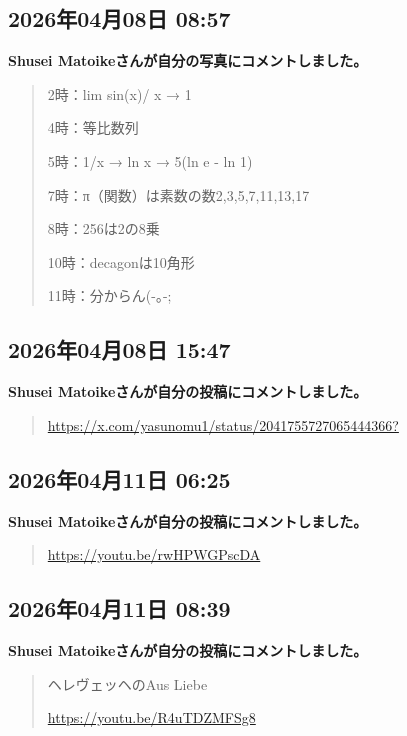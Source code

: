 \subsection*{2026年04月08日 08:57}

\textbf{Shusei Matoikeさんが自分の写真にコメントしました。}

\begin{quote}
2時：lim sin(x)/ x → 1

4時：等比数列

5時：1/x → ln x → 5(ln e - ln 1)

7時：π（関数）は素数の数2,3,5,7,11,13,17

8時：256は2の8乗

10時：decagonは10角形

11時：分からん(-｡-;
\end{quote}

\subsection*{2026年04月08日 15:47}

\textbf{Shusei Matoikeさんが自分の投稿にコメントしました。}

\begin{quote}
\url{https://x.com/yasunomu1/status/2041755727065444366?}
\end{quote}

\subsection*{2026年04月11日 06:25}

\textbf{Shusei Matoikeさんが自分の投稿にコメントしました。}

\begin{quote}
\url{https://youtu.be/rwHPWGPscDA}
\end{quote}

\subsection*{2026年04月11日 08:39}

\textbf{Shusei Matoikeさんが自分の投稿にコメントしました。}

\begin{quote}
ヘレヴェッヘのAus Liebe

\url{https://youtu.be/R4uTDZMFSg8}
\end{quote}

